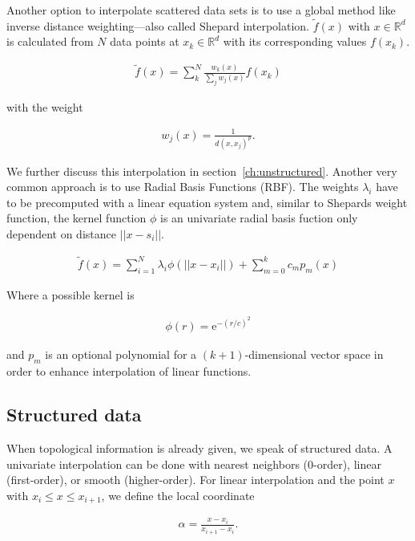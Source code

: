 Another option to interpolate scattered data sets is to use a global method like inverse distance weighting---also called Shepard interpolation. $\widetilde{f}(x)$ with $x \in \mathbb{R}^d$ is calculated from $N$ data points at $x_k \in \mathbb{R}^d$ with its corresponding values $f(x_k)$.

\begin{align}
\widetilde{f}(x) = \sum_{k}^{N}\frac{w_k(x)}{\sum\nolimits_{j}w_j(x)}f(x_k)
\end{align}

with the weight

\begin{align}
w_j(x) = \frac{1}{d(x, x_j)^p}.
\end{align}

We further discuss this interpolation in section~\ref{ch:unstructured}. Another very common approach is to use Radial Basis Functions (RBF). The weights $\lambda_i$ have to be precomputed with a linear equation system and, similar to Shepards weight function, the kernel function $\phi$ is an univariate radial basis fuction only dependent on distance $||x-s_i||$. 

\begin{align}
\widetilde{f}(x) = \sum_{i=1}^N \lambda_i \phi(||x - x_i||) + \sum_{m=0}^k c_m p_m (x)
\end{align}

Where a possible kernel is 

\begin{align}
\phi(r) = \mathrm{e}^{-(r/c)^2}
\end{align}

and $p_m$ is an optional polynomial for a $(k+1)$-dimensional vector space in order to enhance interpolation of linear functions.

\subsection{Structured data}
\label{ch:fu:trilinear}

When topological information is already given, we speak of structured data. A univariate interpolation can be done with nearest neighbors (0-order), linear (first-order), or smooth (higher-order). For linear interpolation and the point $x$ with $x_i \leq x \leq x_{i+1}$, we define the local coordinate

\begin{align}
\alpha = \frac{x-x_i}{x_{i+1}-x_i}.
\end{align}

